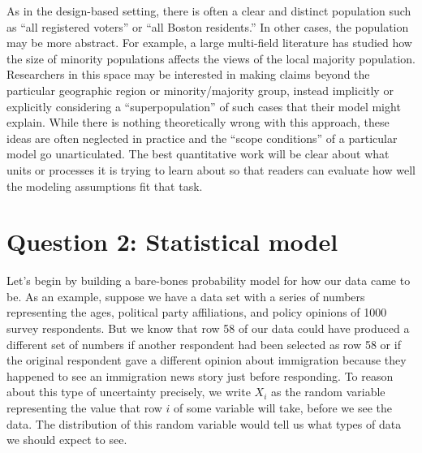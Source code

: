 \documentclass[
  13pt,
  letterpaper,
  DIV=11,
  numbers=noendperiod]{scrreprt}
\theoremstyle{definition}
\theoremstyle{definition}
\theoremstyle{plain}
\theoremstyle{remark}
\begin{document}
As in the design-based setting, there is often a clear and distinct
population such as ``all registered voters'' or ``all Boston
residents.'' In other cases, the population may be more abstract. For
example, a large multi-field literature has studied how the size of
minority populations affects the views of the local majority population.
Researchers in this space may be interested in making claims beyond the
particular geographic region or minority/majority group, instead
implicitly or explicitly considering a ``superpopulation'' of such cases
that their model might explain. While there is nothing theoretically
wrong with this approach, these ideas are often neglected in practice
and the ``scope conditions'' of a particular model go unarticulated. The
best quantitative work will be clear about what units or processes it is
trying to learn about so that readers can evaluate how well the modeling
assumptions fit that task.

\section{Question 2: Statistical
model}\label{question-2-statistical-model}

Let's begin by building a bare-bones probability model for how our data
came to be. As an example, suppose we have a data set with a series of
numbers representing the ages, political party affiliations, and policy
opinions of 1000 survey respondents. But we know that row 58 of our data
could have produced a different set of numbers if another respondent had
been selected as row 58 or if the original respondent gave a different
opinion about immigration because they happened to see an immigration
news story just before responding. To reason about this type of
uncertainty precisely, we write \(X_i\) as the random variable
representing the value that row \(i\) of some variable will take, before
we see the data. The distribution of this random variable would tell us
what types of data we should expect to see.
\end{document}
